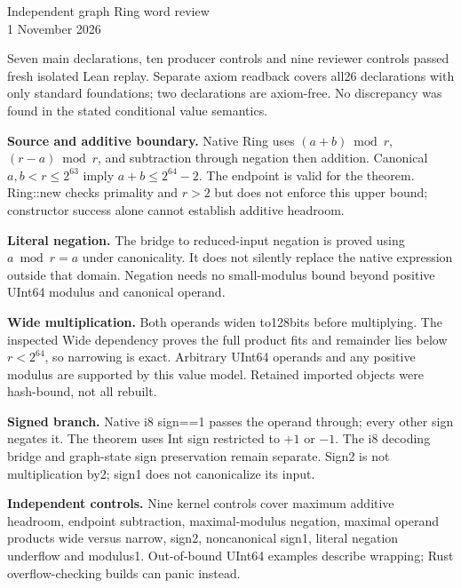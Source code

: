 \documentclass[11pt]{article}\usepackage[margin=0.8in]{geometry}\usepackage[T1]{fontenc}\usepackage{lmodern,tikz,hyperref}\setlength{\parindent}{0pt}\setlength{\parskip}{8pt}\sloppy
\begin{document}
\begin{center}{\Large Independent graph Ring word review}\\1 November 2026\end{center}
Seven main declarations, ten producer controls and nine reviewer controls passed fresh isolated Lean replay. Separate axiom readback covers all26 declarations with only standard foundations; two declarations are axiom-free. No discrepancy was found in the stated conditional value semantics.
\begin{center}\end{center}
\textbf{Source and additive boundary.} Native Ring uses $(a+b)\bmod r$, $(r-a)\bmod r$, and subtraction through negation then addition. Canonical $a,b<r\le2^{63}$ imply $a+b\le2^{64}-2$. The endpoint is valid for the theorem. Ring::new checks primality and $r>2$ but does not enforce this upper bound; constructor success alone cannot establish additive headroom.

\textbf{Literal negation.} The bridge to reduced-input negation is proved using $a\bmod r=a$ under canonicality. It does not silently replace the native expression outside that domain. Negation needs no small-modulus bound beyond positive UInt64 modulus and canonical operand.

\textbf{Wide multiplication.} Both operands widen to128bits before multiplying. The inspected Wide dependency proves the full product fits and remainder lies below $r<2^{64}$, so narrowing is exact. Arbitrary UInt64 operands and any positive modulus are supported by this value model. Retained imported objects were hash-bound, not all rebuilt.

\textbf{Signed branch.} Native i8 sign==1 passes the operand through; every other sign negates it. The theorem uses Int sign restricted to $+1$ or $-1$. The i8 decoding bridge and graph-state sign preservation remain separate. Sign2 is not multiplication by2; sign1 does not canonicalize its input.

\textbf{Independent controls.} Nine kernel controls cover maximum additive headroom, endpoint subtraction, maximal-modulus negation, maximal operand products wide versus narrow, sign2, noncanonical sign1, literal negation underflow and modulus1. Out-of-bound UInt64 examples describe wrapping; Rust overflow-checking builds can panic instead.
\end{document}
